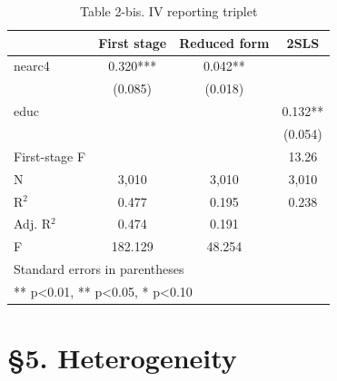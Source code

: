 \begin{table}[htbp]
\centering
\caption{Table 2-bis. IV reporting triplet}
\begin{tabular}{lccc}
\hline\hline
 & First stage & Reduced form & 2SLS \\
\hline
nearc4 & 0.320*** & 0.042** &  \\
 & (0.085) & (0.018) &  \\
educ &  &  & 0.132** \\
 &  &  & (0.054) \\
\hline
First-stage F &  &  & 13.26 \\
\hline
N & 3,010 & 3,010 & 3,010 \\
R$^2$ & 0.477 & 0.195 & 0.238 \\
Adj. R$^2$ & 0.474 & 0.191 &  \\
F & 182.129 & 48.254 &  \\
\hline\hline
\multicolumn{4}{l}{\footnotesize Standard errors in parentheses} \\
\multicolumn{4}{l}{\footnotesize *** p<0.01, ** p<0.05, * p<0.10} \\
\end{tabular}
\end{table}

\section{§5. Heterogeneity}

